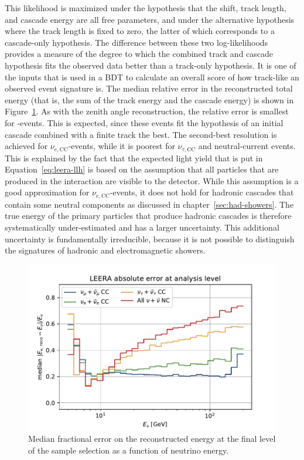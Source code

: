 This likelihood is maximized under the hypothesis that the shift, track length, and cascade energy are all free parameters, and under the alternative hypothesis where the track length is fixed to zero, the latter of which corresponds to a cascade-only hypothesis. The difference between these two log-likelihoods provides a measure of the degree to which the combined track and cascade hypothesis fits the observed data better than a track-only hypothesis. It is one of the inputs that is used in a BDT to calculate an overall score of how track-like an observed event signature is. The median relative error in the reconstructed total energy (that is, the sum of the track energy and the cascade energy) is shown in Figure~\ref{fig:leera-resolution}. As with the zenith angle reconstruction, the relative error is smallest for \numucc-events. This is expected, since these events fit the hypothesis of an initial cascade combined with a finite track the best. The second-best resolution is achieved for $\nu_{e,\mathrm{CC}}$-events, while it is poorest for $\nu_{\tau,\mathrm{CC}}$ and neutral-current events. This is explained by the fact that the expected light yield that is put in Equation~\ref{eq:leera-llh} is based on the assumption that all particles that are produced in the interaction are visible to the detector. While this assumption is a good approximation for $\nu_{e,\mathrm{CC}}$-events, it does not hold for hadronic cascades that contain some neutral components as discussed in chapter~\ref{sec:had-showers}. The true energy of the primary particles that produce hadronic cascades is therefore systematically under-estimated and has a larger uncertainty. This additional uncertainty is fundamentally irreducible, because it is not possible to distinguish the signatures of hadronic and electromagnetic showers.

\begin{figure}
    \centering
    \includegraphics[width=0.8\linewidth]{figures/icecube/reconstruction/leera/leera_absolute_error_final.pdf}
    \caption{Median fractional error on the reconstructed energy at the final level of the sample selection as a function of neutrino energy.}
    \label{fig:leera-resolution}
\end{figure}

